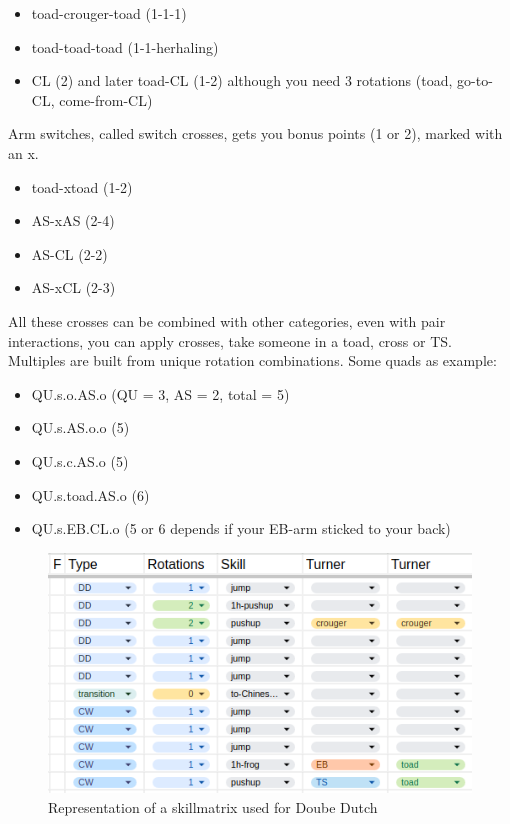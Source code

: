 \begin{itemize}
    \item toad-crouger-toad (1-1-1)
    \item toad-toad-toad (1-1-herhaling)
    \item CL (2) and later toad-CL (1-2) although you need 3 rotations (toad, go-to-CL, come-from-CL)
\end{itemize}

Arm switches, called switch crosses, gets you bonus points (1 or 2), marked with an x.

\begin{itemize}
    \item toad-xtoad (1-2)
    \item AS-xAS (2-4)
    \item AS-CL (2-2)
    \item AS-xCL (2-3)
\end{itemize}

All these crosses can be combined with other categories, even with pair interactions, you can apply crosses, take someone in a toad, cross or TS.
Multiples are built from unique rotation combinations. Some quads as example:

\begin{itemize}
    \item QU.s.o.AS.o (QU = 3, AS = 2, total = 5)
    \item QU.s.AS.o.o (5)
    \item QU.s.c.AS.o (5)
    \item QU.s.toad.AS.o (6)
    \item QU.s.EB.CL.o (5 or 6 depends if your EB-arm sticked to your back)
\end{itemize}

\begin{figure}
    \centering
    \includegraphics[width=0.7\linewidth]{img/doubledutch-matrix}
    \caption[skillmatrix-DD]{Representation of a skillmatrix used for Doube Dutch}
    \label{fig:doubledutch-skillmatrix}
\end{figure}

